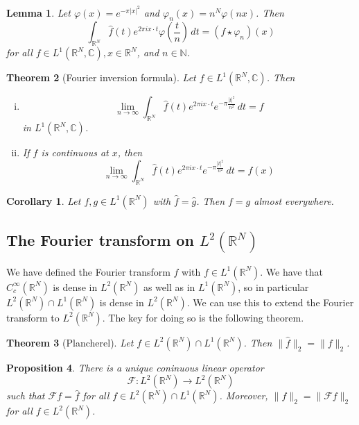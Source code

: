 \documentclass[10pt, oneside, reqno]{amsart}
\theoremstyle{plain}%
\newtheorem{thm}{Theorem}[section]
\newtheorem{lem}[thm]{Lemma}
\newtheorem{prop}[thm]{Proposition}
\newtheorem*{cor}{Corollary}
\theoremstyle{definition}
\theoremstyle{remark}
\newcommand{\R}{\mathbb{R}}
\newcommand{\C}{\mathbb{C}}
\renewcommand{\phi}{\varphi}
\begin{document}
\begin{lem}
	Let $\phi(x) = e^{- \pi |x|^2}$ and $\phi_n(x) = n^N \phi(n x)$.  Then \[
		\int_{\R^N} \hat f (t) e^{2 \pi i x \cdot t} \phi\left(\frac{t}{n} \right) \, dt = (f \star \phi_n) (x)
	\]
	for all $f \in L^1(\R^N,\C), x \in \R^N$, and $n \in \mathbb{N}$.
\end{lem}

\begin{thm}[Fourier inversion formula]
	Let $f \in L^1(\R^N, \C)$. Then 
	\begin{enumerate}[(i)]
		\item \[
			\lim_{n \rightarrow \infty} \int_{\R^N} \hat f (t) e^{2 \pi i x \cdot t} e^{- \pi \frac{|t|^2}{n^2}} \, dt = f
		\] in $L^1(\R^N, \C)$.
		\item If $f$ is continuous at $x$, then \[
			\lim_{n \rightarrow \infty} \int_{\R^N} \hat f (t) e^{2 \pi i x \cdot t} e^{- \pi \frac{|t|^2}{n^2}} \, dt = f(x)
		\]
	\end{enumerate}
\end{thm}

\begin{cor}
	Let $f,g \in L^1(\R^N)$ with $\hat f = \hat g$. Then $f = g$ almost everywhere. 
\end{cor}

\subsection{The Fourier transform on $L^2(\R^N)$} %
\label{sub:the_fourier_transform_on_l_2_r_n_}
	We have defined the Fourier transform $\hat f$ with $f \in L^1(\R^N)$.  We  have that $C_c^\infty(\R^N)$ is dense in $L^2(\R^N)$ as well as in $L^1(\R^N)$, so in particular $L^2(\R^N) \cap L^1(\R^N)$ is dense in $L^2(\R^N)$. We can use this to extend the Fourier transform to $L^2(\R^N)$.  The key for doing so is the following theorem.  
	\begin{thm}[Plancherel]
		Let $f \in L^2(\R^N) \cap L^1(\R^N)$. Then $\| \hat f \|_2 = \| f \|_2$. 
	\end{thm}

\begin{prop}
	There is a unique coninuous linear operator \[
		\mathcal{F} : L^2(\R^N) \rightarrow L^2(\R^N)
	\] such that $\mathcal{F} f = \hat f$ for all $f \in L^2(\R^N) \cap L^1(\R^N)$.  Moreover, $\| f \|_2 = \| \mathcal{F} f \|_2$ for all $f \in L^2(\R^N)$.
\end{prop}
\end{document}
